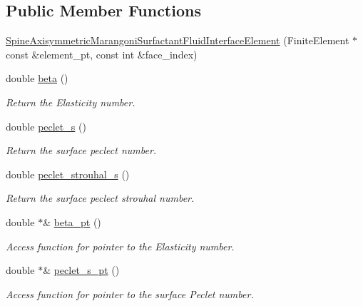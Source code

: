 \subsection*{Public Member Functions}
\begin{DoxyCompactItemize}
\item 
\hyperlink{classoomph_1_1SpineAxisymmetricMarangoniSurfactantFluidInterfaceElement_acb97c1d7f3192309150432c840b34944}{Spine\+Axisymmetric\+Marangoni\+Surfactant\+Fluid\+Interface\+Element} (Finite\+Element $\ast$const \&element\+\_\+pt, const int \&face\+\_\+index)
\item 
double \hyperlink{classoomph_1_1SpineAxisymmetricMarangoniSurfactantFluidInterfaceElement_a898d0f93192f1b42826a5fc1043f8534}{beta} ()
\begin{DoxyCompactList}\small\item\em Return the Elasticity number. \end{DoxyCompactList}\item 
double \hyperlink{classoomph_1_1SpineAxisymmetricMarangoniSurfactantFluidInterfaceElement_a6a927de4f0ec496fce8114f5710f1db2}{peclet\+\_\+s} ()
\begin{DoxyCompactList}\small\item\em Return the surface peclect number. \end{DoxyCompactList}\item 
double \hyperlink{classoomph_1_1SpineAxisymmetricMarangoniSurfactantFluidInterfaceElement_a3af89ee44ddbf97c56f44b13117f5e7e}{peclet\+\_\+strouhal\+\_\+s} ()
\begin{DoxyCompactList}\small\item\em Return the surface peclect strouhal number. \end{DoxyCompactList}\item 
double $\ast$\& \hyperlink{classoomph_1_1SpineAxisymmetricMarangoniSurfactantFluidInterfaceElement_adb3f668c377e5a8c3362e7bd7ac1d989}{beta\+\_\+pt} ()
\begin{DoxyCompactList}\small\item\em Access function for pointer to the Elasticity number. \end{DoxyCompactList}\item 
double $\ast$\& \hyperlink{classoomph_1_1SpineAxisymmetricMarangoniSurfactantFluidInterfaceElement_ae8e42e0510d001c3e4874b0ad32fbe44}{peclet\+\_\+s\+\_\+pt} ()
\begin{DoxyCompactList}\small\item\em Access function for pointer to the surface Peclet number. \end{DoxyCompactList}\item 

\end{DoxyCompactItemize}
